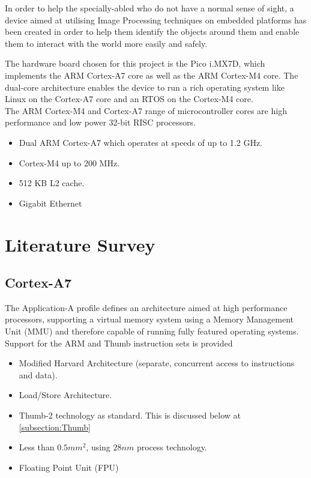 \documentclass[a4paper,conference]{IEEEtran}
\begin{document}
	In order to help the specially-abled who do not have a normal sense of sight, a device aimed at utilising Image Processing techniques on embedded platforms has been created in order to help them identify the objects around them and enable them to interact with the world more easily and safely. 

	The hardware board chosen for this project is the Pico i.MX7D, which implements the ARM Cortex-A7 core as well as the ARM Cortex-M4 core. The dual-core
architecture enables the device to run a rich operating system like Linux on the Cortex-A7 core and an RTOS
on the Cortex-M4 core.\\
\newline
The ARM Cortex-M4 and Cortex-A7 range of microcontroller cores are high performance and
low power 32-bit RISC processors.
	
	\begin{itemize}
		\item Dual ARM Cortex-A7 which operates at speeds of up to 1.2 GHz.
		\item Cortex-M4 up to 200 MHz.
		\item 512 KB L2 cache.
		\item Gigabit Ethernet
		\end{itemize}
		
	\section{Literature Survey} \label{section:literature_survey}
	


	\subsection{Cortex-A7} \label{subsection:Cortex-A7}

	The Application-A profile defines an architecture aimed at high performance
	processors, supporting a virtual memory system using a Memory Management
	Unit (MMU) and therefore capable of running fully featured operating systems.
	Support for the ARM and Thumb instruction sets is provided
	
	\begin{itemize}
		\item Modified Harvard Architecture (separate, concurrent access to instructions and data).
		\item Load/Store Architecture.
		\item Thumb-2 technology as standard. This is discussed below at \ref{subsection:Thumb}
		\item Less than \(0.5mm^2\), using \(28nm\) process technology.
		\item Floating Point Unit (FPU)
	  \end{itemize}
\end{document}
